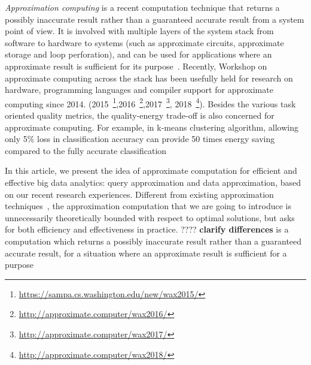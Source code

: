 \item[(3)] {\em Approximation computing} is a recent computation technique that returns a possibly inaccurate result rather than a guaranteed accurate result from a system point of view.  It is involved with multiple layers of the system stack from software to hardware to systems (such as approximate circuits, approximate storage and loop perforation), and can be used for applications where an approximate result is sufficient for its purpose~\cite{AgrawalCGGNOPSS16,Mittal16b}. Recently, Workshop on approximate computing across the stack has been usefully held for research on hardware, programming languages and compiler support  for approximate computing  since 2014.  (2015~\footnote{\small \url{https://sampa.cs.washington.edu/new/wax2015/}},2016~\footnote{\small \url{http://approximate.computer/wax2016/}},2017~\footnote{\small  \url{http://approximate.computer/wax2017/}}, 2018~\footnote{\small  \url{http://approximate.computer/wax2018/}}). Besides the various task oriented quality metrics,  the quality-energy trade-off is also  concerned for approximate computing. For example, in k-means clustering algorithm, allowing only 5\% loss in classification accuracy can provide 50 times energy saving compared to the fully accurate classification~\cite{Mittal16b}
\ei







In this article, we present the idea of approximate computation for efficient and effective big data analytics: query approximation and data approximation, based on our recent research experiences. Different from existing approximation techniques~\cite{CormenLRS01,approx03,FanH14}, the approximation computation that we are going to introduce is unnecessarily theoretically bounded with respect to optimal solutions, but asks for both efficiency and effectiveness in practice.
????
\textbf{clarify differences
}
 is a computation which returns a possibly inaccurate result rather than a guaranteed accurate result, for a situation where an approximate result is sufficient for a purpose

